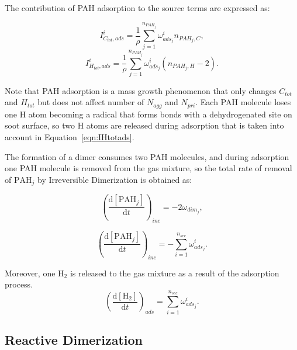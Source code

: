 The contribution of PAH adsorption to the source terms are expressed as:

\begin{equation}
	I^i_{C_{tot},ads} = \frac{1}{\rho}\sum_{j=1}^{n_{PAH_j}} \omega^i_{ads_j} n_{PAH_j,C},
	\label{eqn:ICtotads}
\end{equation}
\begin{equation}
	I^i_{H_{tot},ads} =\frac{1}{\rho} \sum_{j=1}^{n_{PAH_j}} \omega^i_{ads_j} (n_{PAH_j,H}-2).
	\label{eqn:IHtotads}
\end{equation}

Note that PAH adsorption is a mass growth phenomenon that only changes $C_{tot}$ and $H_{tot}$ but does not affect number of $N_{agg}$ and $N_{pri}$. Each PAH molecule loses one H atom becoming a radical that forms bonds with a dehydrogenated site on soot surface, so two H atoms are released during adsorption that is taken into account in Equation~\eqref{eqn:IHtotads}.

The formation of a dimer consumes two PAH molecules, and during adsorption one PAH molecule is removed from the gas mixture, so the total rate of removal of $\mathrm{PAH}_j$ by Irreversible Dimerization is obtained as:

\begin{equation}
	\left(
	\frac{\mathrm{d}\left[{\mathrm{PAH}_j}\right]}{\mathrm{d}t}
	\right)_{inc}
	= 
	-2\omega_{dim_j},
	\label{eqn:PAHscrub_irrevdim_inc}
\end{equation}

\begin{equation}
	\left(
	\frac{\mathrm{d}\left[{\mathrm{PAH}_j}\right]}{\mathrm{d}t}
	\right)_{inc}
	= 
	-\sum_{i=1}^{n_{sec}}\omega^i_{ads_j}.
	\label{eqn:PAHscrub_irrevdim_ads}
\end{equation}

Moreover, one $\mathrm{H_2}$ is released to the gas mixture as a result of the adsorption process.
\begin{equation}
	\left(
	\frac{\mathrm{d}\left[{\mathrm{H_2}}\right]}{\mathrm{d}t}
	\right)_{ads}
	= 
	\sum_{i=1}^{n_{sec}}\omega^i_{ads_j}
	\label{eqn:H2scrub_irrevdim}.
\end{equation}


\subsection{Reactive Dimerization}
\label{sec:reacvdim}

